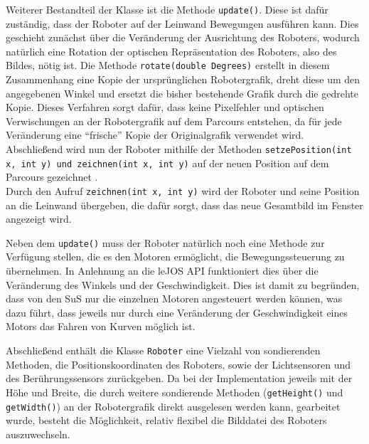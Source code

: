 \documentclass[paper=a4, DIV=14, BCOR=15mm, twoside=on, onecolumn=on, open = right, titlepage =on, parskip =half, headsepline = on, footsepline = on, chapterprefix = on, appendixprefix = off, fontsize = 12pt, numbers = noenddot, abstract = on]{scrbook}
\begin{document}
Weiterer Bestandteil der Klasse ist die Methode \texttt{update()}. Diese ist dafür zuständig, dass der Roboter auf der Leinwand Bewegungen ausführen kann. Dies geschieht zunächst über die Veränderung der Ausrichtung des Roboters, wodurch natürlich eine Rotation der optischen Repräsentation des Roboters, also des Bildes, nötig ist. Die Methode \texttt{rotate(double Degrees)} erstellt in diesem Zusammenhang eine Kopie der ursprünglichen Robotergrafik, dreht diese um den angegebenen Winkel und ersetzt die bisher bestehende Grafik durch die gedrehte Kopie. Dieses Verfahren sorgt dafür, dass keine Pixelfehler und optischen Verwischungen an der Robotergrafik auf dem Parcours entstehen, da für jede Veränderung eine "`frische"' Kopie der Originalgrafik verwendet wird.\\
Abschließend wird nun der Roboter mithilfe der Methoden \texttt{setzePosition(int x, int y) und \texttt{zeichnen(int x, int y)}} auf der neuen Position auf dem Parcours gezeichnet .\\
Durch den Aufruf \texttt{zeichnen(int x, int y)} wird der Roboter und seine Position an die Leinwand übergeben, die dafür sorgt, dass das neue Gesamtbild im Fenster angezeigt wird.

Neben dem \texttt{update()} muss der Roboter natürlich noch eine Methode zur Verfügung stellen, die es den Motoren ermöglicht, die Bewegungssteuerung zu übernehmen. In Anlehnung an die leJOS API funktioniert dies über die Veränderung des Winkels und der Geschwindigkeit. Dies ist damit zu begründen, dass von den SuS nur die einzelnen Motoren angesteuert werden können, was dazu führt, dass jeweils nur durch eine Veränderung der Geschwindigkeit eines Motors das Fahren von Kurven möglich ist.

Abschließend enthält die Klasse \texttt{Roboter} eine Vielzahl von sondierenden Methoden, die Positionskoordinaten des Roboters, sowie der Lichtsensoren und des Berührungssensors zurückgeben. Da bei der Implementation jeweils mit der Höhe und Breite, die durch weitere sondierende Methoden (\texttt{getHeight()} und \texttt{getWidth()}) an der Robotergrafik direkt ausgelesen werden kann, gearbeitet wurde, besteht die Möglichkeit, relativ flexibel die Bilddatei des Roboters auszuwechseln.
\end{document}
